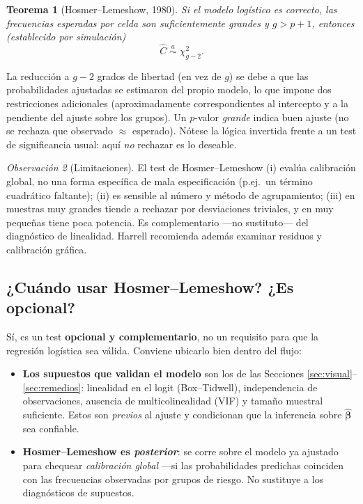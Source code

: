\documentclass[11pt]{article}
\theoremstyle{plain}
\newtheorem{teorema}{Teorema}[section]
\theoremstyle{definition}
\theoremstyle{remark}
\newtheorem{observacion}[teorema]{Observación}
\newcommand{\hbeta}{\hat{\bm{\beta}}}
\begin{document}
\begin{teorema}[Hosmer--Lemeshow, 1980]
Si el modelo logístico es correcto, las frecuencias esperadas por celda son
suficientemente grandes y $g > p+1$, entonces (establecido por simulación)
\[
  \hat C \;\overset{a}{\sim}\; \chi^2_{g-2}.
\]
\end{teorema}

La reducción a $g-2$ grados de libertad (en vez de $g$) se debe a que las
probabilidades ajustadas se estimaron del propio modelo, lo que impone dos
restricciones adicionales (aproximadamente correspondientes al intercepto y a la
pendiente del ajuste sobre los grupos). Un $p$-valor \emph{grande} indica buen
ajuste (no se rechaza que observado $\approx$ esperado). Nótese la lógica
invertida frente a un test de significancia usual: aquí \emph{no} rechazar es lo
deseable.

\begin{observacion}[Limitaciones]
El test de Hosmer--Lemeshow (i) evalúa calibración global, no una forma
específica de mala especificación (p.ej.\ un término cuadrático faltante);
(ii) es sensible al número y método de agrupamiento; (iii) en muestras muy
grandes tiende a rechazar por desviaciones triviales, y en muy pequeñas tiene
poca potencia. Es complementario ---no sustituto--- del diagnóstico de
linealidad. Harrell recomienda además examinar residuos y calibración gráfica.
\end{observacion}

\subsection{¿Cuándo usar Hosmer--Lemeshow? ¿Es opcional?}

Sí, es un test \textbf{opcional y complementario}, no un requisito para que la
regresión logística sea válida. Conviene ubicarlo bien dentro del flujo:

\begin{itemize}
  \item \textbf{Los supuestos que validan el modelo} son los de las Secciones
        \ref{sec:visual}--\ref{sec:remedios}: linealidad en el logit
        (Box--Tidwell), independencia de observaciones, ausencia de
        multicolinealidad (VIF) y tamaño muestral suficiente. Estos son
        \emph{previos} al ajuste y condicionan que la inferencia sobre $\hbeta$
        sea confiable.
  \item \textbf{Hosmer--Lemeshow es \emph{posterior}}: se corre sobre el modelo
        ya ajustado para chequear \emph{calibración global} ---si las
        probabilidades predichas coinciden con las frecuencias observadas por
        grupos de riesgo. No sustituye a los diagnósticos de supuestos.
\end{itemize}
\end{document}
